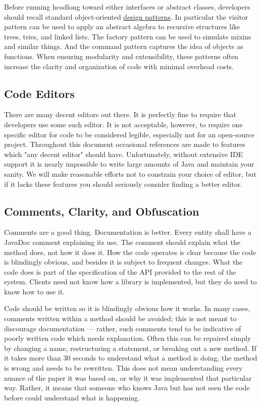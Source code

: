 Before running headlong toward either interfaces or abstract classes, developers should recall standard object-oriented \href{http://en.wikipedia.org/wiki/Design_pattern_(computer_science)}{design patterns}. In particular the visitor pattern can be used to apply an abstract algebra to recursive structures like trees, tries, and linked lists. The factory pattern can be used to simulate mixins and similar things. And the command pattern captures the idea of objects as functions. When ensuring modularity and extensibility, these patterns often increase the clarity and organization of code with minimal overhead costs. 

\subsection{Code Editors}

There are many decent editors out there. It is perfectly fine to require that developers use some such editor. It is not acceptable, however, to require one specific editor for code to be considered legible, especially not for an open-source project. Throughout this document occasional references are made to features which "any decent editor" should have. Unfortunately, without extensive IDE support it is nearly impossible to write large amounts of Java and maintain your sanity. We will make reasonable efforts not to constrain your choice of editor, but if it lacks these features you should seriously consider finding a better editor. 


\subsection{Comments, Clarity, and Obfuscation}

Comments are a good thing. Documentation is better. Every entity shall have a JavaDoc comment explaining its use. The comment should explain what the method does, not how it does it. How the code operates is clear because the code is blindingly obvious, and besides it is subject to frequent changes. What the code does is part of the specification of the API provided to the rest of the system. Clients need not know how a library is implemented, but they do need to know how to use it.

Code should be written so it is blindingly obvious how it works. In many cases, comments written within a method should be avoided; this is not meant to discourage documentation --- rather, such comments tend to be indicative of poorly written code which needs explanation. Often this can be repaired simply by changing a name, restructuring a statement, or breaking out a new method. If it takes more than 30 seconds to understand what a method is doing, the method is wrong and needs to be rewritten. This does not mean understanding every nuance of the paper it was based on, or why it was implemented that particular way. Rather, it means that someone who knows Java but has not seen the code before could understand what is happening.

